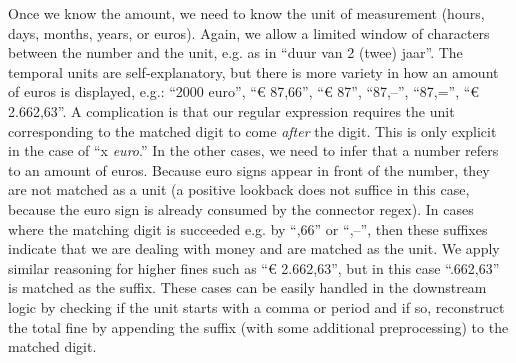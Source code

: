 \documentclass[a4paper]{article}
\begin{document}
Once we know the amount, we need to know the unit of measurement (hours, days, months, years, or euros).
Again, we allow a limited window of characters between the number and the unit, e.g. as in ``duur van 2 (twee) jaar''.
The temporal units are self-explanatory, but there is more variety in how an amount of euros is displayed, e.g.: ``2000 euro'', ``€ 87,66'', ``€ 87'', ``87,--'', ``87,='', ``€ 2.662,63''.
A complication is that our regular expression requires the unit corresponding to the matched digit to come \emph{after} the digit.
This is only explicit in the case of ``x \emph{euro}.''
In the other cases, we need to infer that a number refers to an amount of euros.
Because euro signs appear in front of the number, they are not matched as a unit (a positive lookback does not suffice in this case, because the euro sign is already consumed by the connector regex).
In cases where the matching digit is succeeded e.g. by ``,66'' or ``,--'', then these suffixes indicate that we are dealing with money and are matched as the unit.
We apply similar reasoning for higher fines such as ``€ 2.662,63'', but in this case ``.662,63'' is matched as the suffix.
These cases can be easily handled in the downstream logic by checking if the unit starts with a comma or period and if so, reconstruct the total fine by appending the suffix (with some additional preprocessing) to the matched digit.
\end{document}
